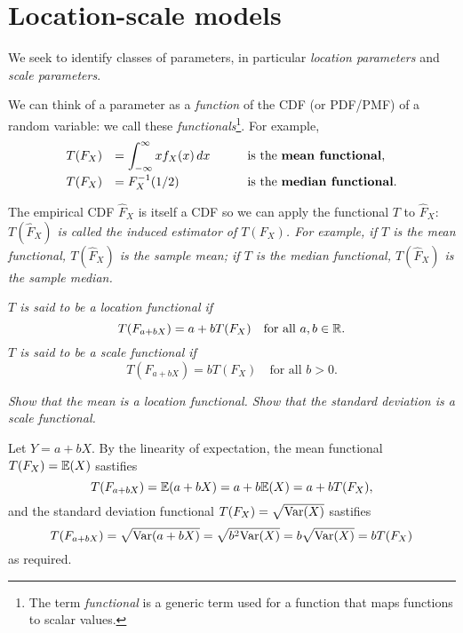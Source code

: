
\section{Location-scale models}

We seek to identify classes of parameters, in particular \emph{location parameters} and \emph{scale parameters}. 

We can think of a parameter as a \emph{function} of the CDF (or PDF/PMF) of a random variable: we call these \emph{functionals}\footnote{The term \textit{functional} is a generic term used for a function that maps functions to scalar values.}. 
For example,
\[\begin{array}{lll}
T(F_X) & = \displaystyle\int_{-\infty}^{\infty} xf_X(x)\,dx	& \qquad\text{is the \emph{mean functional},} \\[2ex]
T(F_X) & = F_X^{-1}(1/2)	& \qquad\text{is the \emph{median functional}.}
\end{array}
\]

\begin{remark}
The empirical CDF $\hat{F}_X$ is itself a CDF so we can apply the functional $T$ to $\hat{F}_X$:
\bit
\it $T(\hat{F}_X)$ is called the \emph{induced estimator} of $T(F_X)$. 
\eit
For example,
\bit
\it if $T$ is the mean functional, $T(\hat{F}_X)$ is the sample mean;
\it if $T$ is the median functional, $T(\hat{F}_X)$ is the sample median.
\eit
\end{remark}

\begin{definition}
\ben
\it $T$ is said to be a \emph{location functional} if 
\[
T(F_{a+bX}) = a + bT(F_X) \quad\text{for all $a,b\in\R$.}
\]
\it $T$ is said to be a \emph{scale functional} if 
\[
T(F_{a+bX}) = bT(F_X) \quad\text{for all $b>0$.}
\]
\een
\end{definition}

\begin{example}
\ben
\it Show that the mean is a location functional.
\it Show that the standard deviation is a scale functional.
\een
\begin{solution}
Let $Y=a+bX$. By the linearity of expectation, the mean functional $T(F_X) = \expe(X)$ sastifies
\[
T(F_{a+bX})= \expe(a+bX) = a+b\expe(X) = a + bT(F_X),
\]
and the standard deviation functional $T(F_X) = \sqrt{\var(X)}$ sastifies
\[
T(F_{a+bX}) = \sqrt{\var(a+bX)} = \sqrt{b^2\var(X)} = b\sqrt{\var(X)} = bT(F_X)
\]
as required.
\end{solution}
\end{example}

